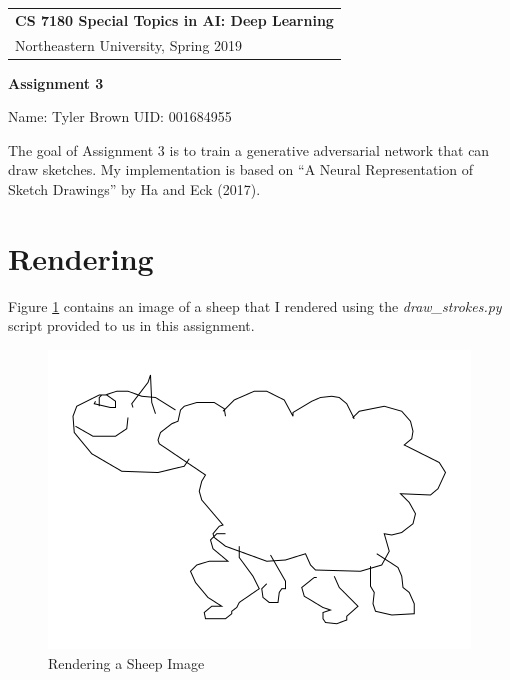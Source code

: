 \documentclass[a4paper,12pt]{article} %
\begin{document}
\thispagestyle{empty} %

\begin{tabular}{p{15.5cm}} %
{\large \bf CS 7180 Special Topics in AI: Deep Learning} \\
Northeastern University, Spring 2019 \\
\hline %
\end{tabular} %

\vspace*{0.3cm} %

\begin{center} %
    {\Large \bf Assignment 3} %
    \vspace{2mm}
    
    {Name: Tyler Brown UID: 001684955}
\end{center} 
%
\vspace{0.2cm}

The goal of Assignment 3 is to train a generative adversarial network
that can draw sketches. My implementation is based on ``A Neural
Representation of Sketch Drawings'' \cite{DBLP:journals/corr/HaE17} by
Ha and Eck (2017). 

\section{Rendering}

Figure \ref{fig:rendersheep} contains an image of a sheep that I rendered
using the \textit{draw\_strokes.py} script provided to us in this assignment.

\begin{figure}[h]
  \begin{center}
    \includegraphics[scale=0.5]{sample_sheep}
    \caption{Rendering a Sheep Image}
    \label{fig:rendersheep}
    \end{center}
\end{figure}
\end{document}
